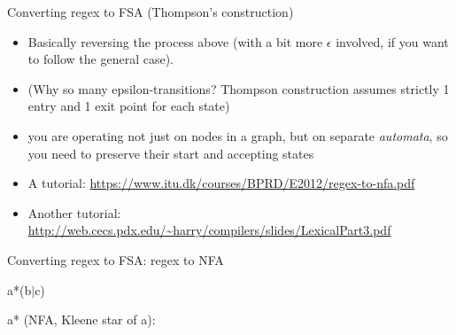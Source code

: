 \documentclass{beamer}
\def\dx{1cm} \def\dy{1.5cm}
\newcommand{\newState}[4]{\node[state,#3](#1)[#4]{#2};}
\newcommand{\newTransition}[4]{\path[->] (#1) edge [#4] node {#3} (#2);}
\begin{document}
\begin{frame}{Converting regex to FSA (Thompson's construction)}
  \begin{itemize}
  \item Basically reversing the process above (with a bit more
    $\epsilon$ involved, if you want to follow the general case).
  
  \item (Why so many epsilon-transitions?  Thompson construction
    assumes strictly 1 entry and 1 exit point for each state)

  \item you are operating not just on nodes in a graph, but on
    separate {\it automata}, so you need to preserve their start and
    accepting states

  \item A tutorial:
    \url{https://www.itu.dk/courses/BPRD/E2012/regex-to-nfa.pdf}

  \item Another tutorial:
    \url{http://web.cecs.pdx.edu/~harry/compilers/slides/LexicalPart3.pdf}
\end{itemize}
\end{frame}

\begin{frame}[t]{Converting regex to FSA: regex to NFA}

a*(b$\vert$c)

\pause

a* (NFA, Kleene star of a):

\begin{center}
\end{center}
\end{frame}
\end{document}
